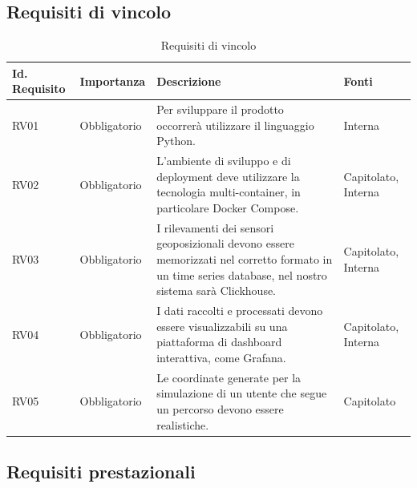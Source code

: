 \documentclass[11pt]{article}
\begin{document}
\begin{justify}
\subsection{Requisiti di vincolo}

\begin{table}[H]
\centering
\renewcommand{\arraystretch}{1.5}
\begin{tabular}{|>{\centering\arraybackslash}m{2.7cm}|>{\centering\arraybackslash}m{2.7cm}|>{\centering\arraybackslash}m{6cm}|>{\centering\arraybackslash}m{2.1cm}|}
\hline
\textbf{Id. Requisito} & \textbf{Importanza} & \textbf{Descrizione} & \textbf{Fonti}\\
\hline
RV01 & Obbligatorio &  Per sviluppare il prodotto occorrerà utilizzare il linguaggio Python. & Interna\\
\hline 
RV02 & Obbligatorio & L'ambiente di sviluppo e di deployment deve utilizzare la tecnologia multi-container, in particolare Docker Compose. & Capitolato, Interna\\
\hline
RV03 & Obbligatorio & I rilevamenti dei sensori geoposizionali
devono essere memorizzati nel corretto formato in un time series database, nel nostro sistema sarà Clickhouse. & Capitolato, Interna \\
\hline
RV04 & Obbligatorio & I dati raccolti e processati devono essere visualizzabili su una piattaforma di dashboard interattiva, come Grafana. & Capitolato, Interna\\
\hline
RV05 & Obbligatorio & Le coordinate generate per la simulazione di un utente che segue un percorso devono essere realistiche. & Capitolato\\
\hline
\end{tabular}

\caption{Requisiti di vincolo}
\end{table}


\newpage
\subsection{Requisiti prestazionali}


\end{justify}
\end{document}
